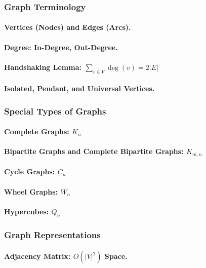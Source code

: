 \subsubsection{Graph Terminology}
\paragraph{Vertices (Nodes) and Edges (Arcs).}
\paragraph{Degree: In-Degree, Out-Degree.}
\paragraph{Handshaking Lemma: $\sum_{v \in V} \deg(v) = 2|E|$}
\paragraph{Isolated, Pendant, and Universal Vertices.}

\subsubsection{Special Types of Graphs}
\paragraph{Complete Graphs: $K_n$}
\paragraph{Bipartite Graphs and Complete Bipartite Graphs: $K_{m,n}$}
\paragraph{Cycle Graphs: $C_n$}
\paragraph{Wheel Graphs: $W_n$}
\paragraph{Hypercubes: $Q_n$}

\subsubsection{Graph Representations}
\paragraph{Adjacency Matrix: $O(|V|^2)$ Space.}
